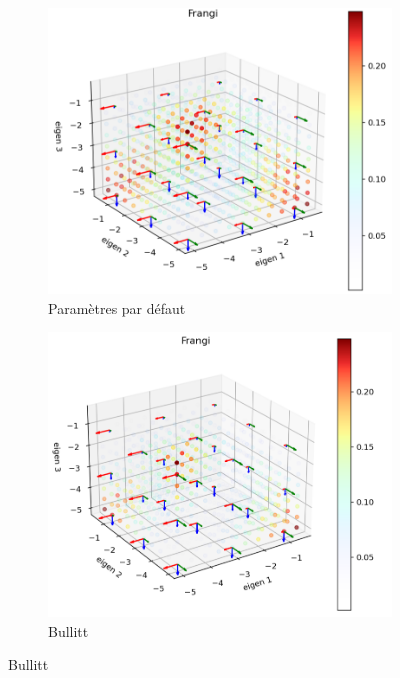 \begin{figure}[!ht]
  \captionsetup[subfigure]{justification=centering}
  \centering
  \begin{subfigure}[t]{0.45\textwidth}
    \centering
    \includegraphics[width=\textwidth]{Images/Frangi_default_P.png}
    \caption{Paramètres par défaut}
  \end{subfigure}
  \begin{subfigure}[t]{0.45\textwidth}
    \centering
    \includegraphics[width=\textwidth]{Images/Bullitt_Frangi_BP.png}
    \caption{Bullitt}

\end{subfigure}
\end{figure}
